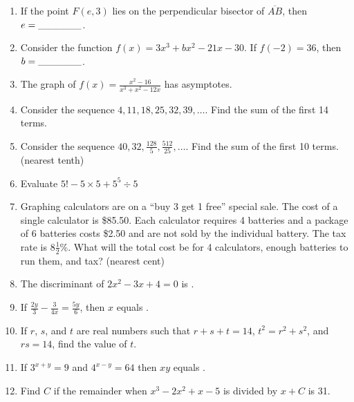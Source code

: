 \documentclass[../uilmath.tex]{subfiles}
\begin{document}
\begin{enumerate}[label=\bfseries\arabic*.]
        \item %
        If the point $F(e,3)$ lies on the perpendicular bisector of $\overline{AB}$, then $e=\_\_\_\_\_\_$.

        \item %
        Consider the function $f(x)=3x^3+bx^2-21x-30$. If $f(-2)=36$, then $b=\_\_\_\_\_\_$.

        \item %
        The graph of $f(x)=\frac{x^2-16}{x^3+x^2-12x}$ has \blank asymptotes.

        \item %
        Consider the sequence $4,11,18,25,32,39,\dots$. Find the sum of the first 14 terms.

        \item %
        Consider the sequence $40,32,\frac{128}{5},\frac{512}{25},\dots$. Find the sum of the first 10 terms. (nearest tenth)

        \item %
        Evaluate $5!-5\times 5+5^5 \div 5$

        \item %
        Graphing calculators are on a ``buy 3 get 1 free'' special sale. The cost of a single calculator is \$85.50.
        Each calculator requires 4 batteries and a package of 6 batteries costs \$2.50 and are not sold by the individual battery.
        The tax rate is $8\frac{1}{2}$\%. What will the total cost be for 4 calculators, enough batteries to run them, and tax? (nearest cent)

        \item %
        The discriminant of $2x^2-3x+4=0$ is \blank. 

        \item %
        If $\frac{2y}{3}-\frac{3}{4x}=\frac{5y}{6}$, then $x$ equals \blank.

        \item %
        If $r$, $s$, and $t$ are real numbers such that $r+s+t=14$, $t^2=r^2+s^2$, and $rs=14$, find the value of $t$.

        \item %
        If $3^{x+y}=9$ and $4^{x-y}=64$ then $xy$ equals \blank.

        \item %
        Find $C$ if the remainder when $x^3-2x^2+x-5$ is divided by $x+C$ is 31.


\end{enumerate}
\end{document}
